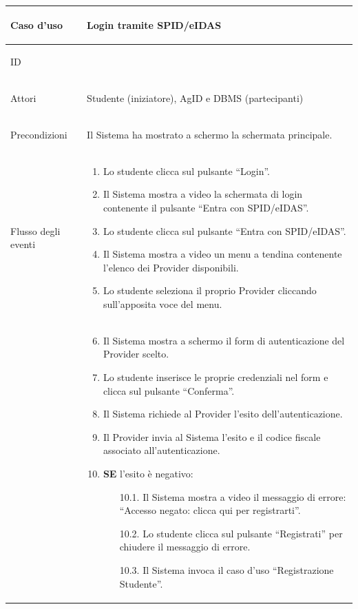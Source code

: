 \documentclass[12pt,a4paper]{article}
\begin{document}
\small
\begin{longtable}{|
>{\columncolor{unipablue}\color{white}\bfseries\raggedright\arraybackslash}p{3.4cm}|
>{\raggedright\arraybackslash}p{11.1cm}|}
\hline
Caso d’uso & Login tramite SPID/eIDAS \\ \hline
ID & 1.2 \\ \hline
Attori & Studente (iniziatore), AgID e DBMS (partecipanti) \\ \hline
Precondizioni & Il Sistema ha mostrato a schermo la schermata principale. \\ \hline
Flusso degli eventi &
\begin{enumerate}
    \item Lo studente clicca sul pulsante ``Login''.
    \item Il Sistema mostra a video la schermata di login contenente il pulsante ``Entra con SPID/eIDAS''.
    \item Lo studente clicca sul pulsante ``Entra con SPID/eIDAS''.
    \item Il Sistema mostra a video un menu a tendina contenente l'elenco dei Provider disponibili.
    \item Lo studente seleziona il proprio Provider cliccando sull'apposita voce del menu.
\end{enumerate} \\
&
\begin{enumerate}
    \setcounter{enumi}{5}
    \item Il Sistema mostra a schermo il form di autenticazione del Provider scelto.
    \item Lo studente inserisce le proprie credenziali nel form e clicca sul pulsante ``Conferma''.
    \item Il Sistema richiede al Provider l'esito dell'autenticazione.
    \item Il Provider invia al Sistema l'esito e il codice fiscale associato all'autenticazione.
    \item \textbf{SE} l'esito è negativo:
    \begin{itemize}
        \item[10.1.] Il Sistema mostra a video il messaggio di errore: ``Accesso negato: clicca qui per registrarti''.
        \item[10.2.] Lo studente clicca sul pulsante ``Registrati'' per chiudere il messaggio di errore.
        \item[10.3.] Il Sistema invoca il caso d'uso ``Registrazione Studente''.
    \end{itemize}

\end{enumerate}
\end{longtable}
\end{document}
